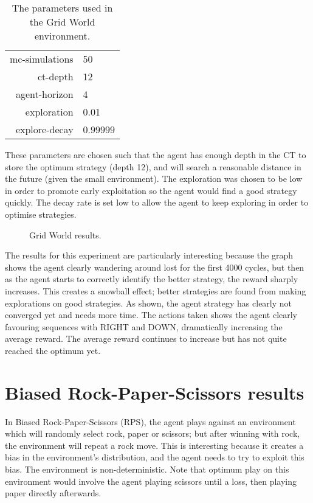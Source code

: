 \documentclass[pdftex,twoside,a4paper]{report}
\begin{document}
\begin{table}[h]
\begin{center}
\begin{tabular}{| r | l | }
\hline
mc-simulations & 50\\
ct-depth & 12\\
agent-horizon & 4\\
exploration & 0.01\\
explore-decay & 0.99999\\
\hline
\end{tabular}
\caption{The parameters used in the Grid World environment.}
\end{center}
\end{table}

These parameters are chosen such that the agent has enough depth in the CT to store the optimum strategy (depth 12), and will search a reasonable distance in the future (given the small environment). The exploration was chosen to be low in order to promote early exploitation so the agent would find a good strategy quickly. The decay rate is set low to allow the agent to keep exploring in order to optimise strategies.

\begin{figure}[h]
 \begin{center}
 \end{center}
 \caption{Grid World results.}
 \label{fig:grid_results}
\end{figure}
The results for this experiment are particularly interesting because the graph shows the agent clearly wandering around lost for the first 4000 cycles, but then as the agent starts to correctly identify the better strategy, the reward sharply increases. This creates a snowball effect; better strategies are found from making explorations on good strategies. As shown, the agent strategy has clearly not converged yet and needs more time. The actions taken shows the agent clearly favouring sequences with RIGHT and DOWN, dramatically increasing the average reward. The average reward continues to increase but has not quite reached the optimum yet.

\section{Biased Rock-Paper-Scissors results}
In Biased Rock-Paper-Scissors (RPS), the agent plays against an environment which will randomly select rock, paper or scissors; but after winning with rock, the environment will repeat a rock move. This is interesting because it creates a bias in the environment's distribution, and the agent needs to try to exploit this bias. The environment is non-deterministic. Note that optimum play on this environment would involve the agent playing scissors until a loss, then playing paper directly afterwards.
\end{document}
